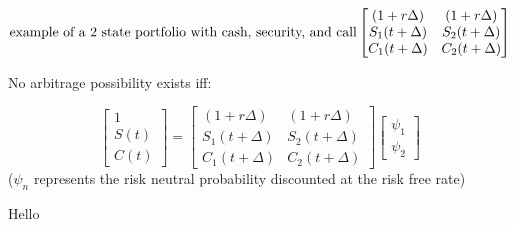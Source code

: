 \documentclass[
  twocolumn]{article}
\newenvironment{Shaded}{\begin{snugshade}}{\end{snugshade}}
\newcommand{\NormalTok}[1]{#1}
\begin{document}
\[
\text{example of a 2 state portfolio with cash, security, and call}\\ \begin{bmatrix}
(1+r\Delta) & (1+r\Delta) \\
S_1(t + \Delta) & S_2(t + \Delta) \\
C_1(t + \Delta) & C_2(t + \Delta) 
\end{bmatrix}
\]

No arbitrage possibility exists iff:

\[
\begin{bmatrix}
1 \\ S(t) \\ C(t)
\end{bmatrix} 
=
\begin{bmatrix}
(1+r\Delta) & (1+r\Delta) \\
S_1(t + \Delta) & S_2(t + \Delta) \\
C_1(t + \Delta) & C_2(t + \Delta) 
\end{bmatrix} 
\begin{bmatrix}
\psi_1 \\ \psi_2
\end{bmatrix} 
\] (\(\psi_n\) represents the risk neutral probability discounted at the
risk free rate)

\begin{Shaded}
\begin{Highlighting}[]
\NormalTok{Hello}
\end{Highlighting}
\end{Shaded}
\end{document}
